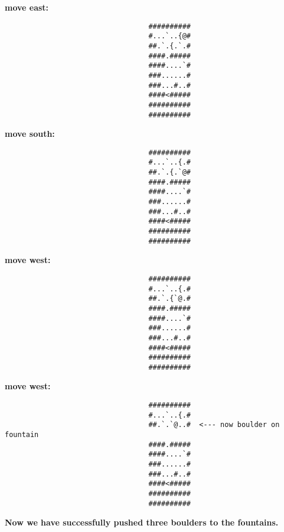 \begin{MyGreenBox}[frametitle={\textbf{Iteration 2 MiniHack Prompt}}]
{\textbf{move east:}
\begin{verbatim}
                                  ##########
                                  #...`..{@#
                                  ##.`.{.`.#
                                  ####.#####
                                  ####....`#
                                  ###......#
                                  ###...#..#
                                  ####<#####
                                  ##########
                                  ##########
\end{verbatim}

\textbf{move south:}
\begin{verbatim}
                                  ##########
                                  #...`..{.#
                                  ##.`.{.`@#
                                  ####.#####
                                  ####....`#
                                  ###......#
                                  ###...#..#
                                  ####<#####
                                  ##########
                                  ##########
\end{verbatim}

\textbf{move west:}
\begin{verbatim}
                                  ##########
                                  #...`..{.#
                                  ##.`.{`@.#
                                  ####.#####
                                  ####....`#
                                  ###......#
                                  ###...#..#
                                  ####<#####
                                  ##########
                                  ##########
\end{verbatim}

\textbf{move west:}
\begin{verbatim}
                                  ##########
                                  #...`..{.#
                                  ##.`.`@..#  <--- now boulder on fountain
                                  ####.#####
                                  ####....`#
                                  ###......#
                                  ###...#..#
                                  ####<#####
                                  ##########
                                  ##########
\end{verbatim}

\textbf{Now we have successfully pushed three boulders to the fountains.}

}
\end{MyGreenBox}
